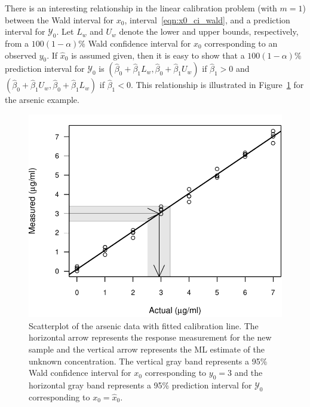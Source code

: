 \documentclass[cmfont,usenames,dvipsnames,leqno]{afit-etd}\usepackage[]{graphicx}\usepackage[]{color}
\makeatletter
\def\maxwidth{ %
  \ifdim\Gin@nat@width>\linewidth
    \linewidth
  \else
    \Gin@nat@width
  \fi
}
\newenvironment{knitrout}{}{} %
\renewenvironment{knitrout}{\begin{singlespace}}{\end{singlespace}}
\newcommand{\mc}[1]{\ensuremath{\mathcal{#1}}}
\newcommand{\wh}[1]{\ensuremath{\widehat{#1}}}
\makeatother
\begin{document}
There is an interesting relationship in the linear calibration problem (with $m = 1$) between the Wald interval for $x_0$, interval~\eqref{eqn:x0_ci_wald}, and a prediction interval for $\mc{Y}_0$. Let $L_w$ and $U_w$ denote the lower and upper bounds, respectively, from a $100(1 - \alpha)\%$ Wald confidence interval for $x_0$ corresponding to an observed $y_0$. If $\wh{x}_0$ is assumed given, then it is easy to show that a $100(1 - \alpha)\%$ prediction interval for $\mc{Y}_0$ is $(\wh{\beta}_0+\wh{\beta}_1 L_w, \wh{\beta}_0+\wh{\beta}_1 U_w)$ if $\wh{\beta}_1 > 0$ and $(\wh{\beta}_0+\wh{\beta}_1 U_w, \wh{\beta}_0+\wh{\beta}_1 L_w)$ if $\wh{\beta}_1 < 0$. This relationship is illustrated in Figure~\ref{fig:arsenic-wald} for the arsenic example. %

\begin{knitrout}
\color{fgcolor}\begin{figure}[H]

\includegraphics[width=\maxwidth]{figure/arsenic-wald} \caption[Relationship beween Wald interval for $x_0$ and prediction interval for $\mc{Y}_0$]{Scatterplot of the arsenic data with fitted calibration line. The horizontal arrow represents the response measurement for the new sample and the vertical arrow represents the \ac{ML} estimate of the unknown concentration. The vertical gray band represents a 95\% Wald confidence interval for $x_0$ corresponding to $y_0 = 3$ and the horizontal gray band represents a 95\% prediction interval for $\mc{Y}_0$ corresponding to $x_0 = \wh{x}_0$.\label{fig:arsenic-wald}}
\end{figure}


\end{knitrout}
\end{document}
